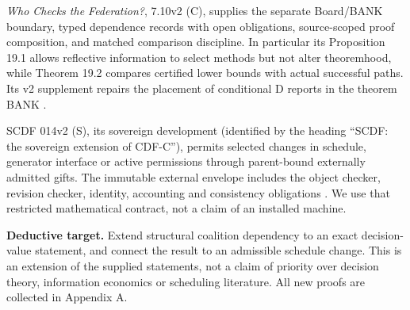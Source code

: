 \documentclass[11pt,letterpaper]{article}
\begin{document}
\emph{Who Checks the Federation?}, 7.10v2 (C), supplies the separate Board/BANK boundary, typed dependence records with open obligations, source-scoped proof composition, and matched comparison discipline. In particular its Proposition 19.1 allows reflective information to select methods but not alter theoremhood, while Theorem 19.2 compares certified lower bounds with actual successful paths. Its v2 supplement repairs the placement of conditional D reports in the theorem BANK \cite{checks}.

SCDF 014v2 (S), its sovereign development (identified by the heading ``SCDF: the sovereign extension of CDF-C''), permits selected changes in schedule, generator interface or active permissions through parent-bound externally admitted gifts. The immutable external envelope includes the object checker, revision checker, identity, accounting and consistency obligations \cite{scdf}. We use that restricted mathematical contract, not a claim of an installed machine.

\begin{center}
\end{center}
\textbf{Deductive target.} Extend structural coalition dependency to an exact decision-value statement, and connect the result to an admissible schedule change. This is an extension of the supplied statements, not a claim of priority over decision theory, information economics or scheduling literature. All new proofs are collected in Appendix A.
\end{document}
